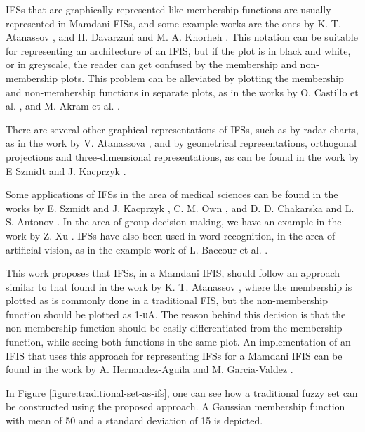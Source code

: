 IFSs that are graphically represented like membership functions are usually
represented in Mamdani FISs, and some example works are the ones by
K. T. Atanassov \cite{Atanassov1986}, and H. Davarzani and M. A. Khorheh
\cite{Davarzani2013}. This notation can be suitable for representing an
architecture of an IFIS, but if the plot is in black and white, or in greyscale,
the reader can get confused by the membership and non-membership plots. This
problem can be alleviated by plotting the membership and non-membership
functions in separate plots, as in the works by O. Castillo et
al. \cite{castillo2007intuitionistic}, and M. Akram et al. \cite{Akram2014}.

There are several other graphical representations of IFSs, such as by radar
charts, as in the work by V. Atanassova \cite{Atanassova2010}, and by
geometrical representations, orthogonal projections and three-dimensional
representations, as can be found in the work by E Szmidt and J. Kacprzyk
\cite{Szmidt2000}.

Some applications of IFSs in the area of medical sciences can be found in the
works by E. Szmidt and J. Kacprzyk \cite{Szmidt2001}, C. M. Own \cite{Own2009},
and D. D. Chakarska and L. S. Antonov \cite{Antonov1995}. In the area of group
decision making, we have an example in the work by Z. Xu \cite{Xu2007}. IFSs
have also been used in word recognition, in the area of artificial vision, as in
the example work of L. Baccour et al. \cite{Baccour2008}.

This work proposes that IFSs, in a Mamdani IFIS, should follow an approach
similar to that found in the work by K. T. Atanassov \cite{Atanassov2003}, where
the membership is plotted as is commonly done in a traditional FIS, but the
non-membership function should be plotted as 1-υA. The reason behind this
decision is that the non-membership function should be easily differentiated
from the membership function, while seeing both functions in the same plot. An
implementation of an IFIS that uses this approach for representing IFSs for a
Mamdani IFIS can be found in the work by A. Hernandez-Aguila and
M. Garcia-Valdez \cite{Hernandez-aguila}.

In Figure \ref{figure:traditional-set-as-ifs}, one can see how a traditional
fuzzy set can be constructed using the proposed approach. A Gaussian membership
function with mean of 50 and a standard deviation of 15 is depicted.

